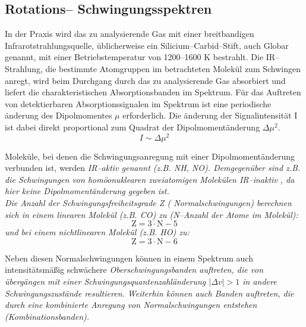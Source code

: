 \subsection{\label{rotschwing}Rotations-- Schwingungsspektren}

In der Praxis wird das zu analysierende Gas mit einer
breitbandigen Infrarotstrahlungsquelle, üblicherweise ein
Silicium--Carbid--Stift, auch Globar genannt, mit einer
Be\-triebs\-tem\-pe\-ra\-tur von 1200--1600 K bestrahlt. Die
IR--Strahlung, die bestimmte Atomgruppen im betrachteten Molekül
zum Schwingen anregt, wird beim Durchgang durch das zu
analysierende Gas absorbiert und liefert die charakteristischen
Absorptionsbanden im Spektrum. Für das Auftreten von
detektierbaren Absorptionssignalen im Spektrum ist eine
periodische änderung des Dipolmomentes $\mu$ erforderlich. Die
änderung der Sig\-nal\-in\-ten\-si\-tät I ist dabei direkt
proportional zum Quadrat der Dipolmomentänderung $\Delta \mu^2$.
\begin{equation}\label{eqmu}
  I \sim \Delta \mu^2
\end{equation}

Moleküle, bei denen die Schwingungsanregung mit einer
Dipolmomentänderung verbunden ist, werden \it IR--aktiv \rm
genannt (z.B. NH, NO). Demgegenüber sind z.B. die
Schwingungen von homöonuklearen zweiatomigen Molekülen \it
IR--inaktiv \rm , da hier keine Dipolmomentänderung gegeben ist.\\

Die Anzahl der Schwingungsfreiheitsgrade Z (\it
Normalschwingungen\rm ) berechnen sich in einem linearen Molekül
(z.B. CO) zu (N--Anzahl der Atome im Molekül):
\begin{equation}\label{eqlin}
 \text{Z}=3 \cdot \text{N} - 5
\end{equation}
und bei einem nichtlinearen Molekül (z.B. HO) zu:
\begin{equation}\label{eqnlin}
 \text{Z}=3 \cdot \text{N} - 6
\end{equation}

Neben diesen Normalschwingungen können in einem Spektrum auch
intensitätsmä{\ss}ig schwächere \it Oberschwingungsbanden \rm
auftreten, die von übergängen mit einer
Schwingungsquantenzahländerung $\mid\!\Delta v\!\mid>1$ in andere
Schwingungszustände resultieren. Weiterhin können auch Banden
auftreten, die durch eine kombinierte Anregung von
Normalschwingungen entstehen (\it Kombinationsbanden\rm ).\\


